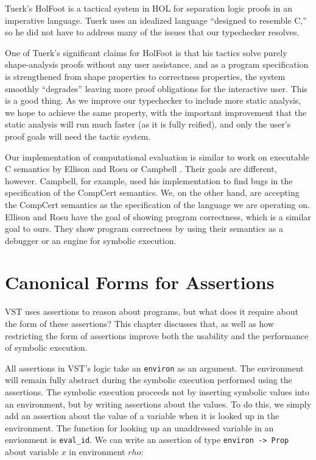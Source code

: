 \documentclass{puthesis}
\begin{document}
Tuerk's HolFoot \cite{Tuer09} is a tactical system in HOL for
separation logic proofs in an imperative language.  Tuerk uses an
idealized language ``designed to resemble C,'' so he did not have to
address many of the issues that our typechecker resolves.

One of Tuerk's significant claims for HolFoot is that his tactics
solve purely shape-analysis proofs without any user assistance, and as
a program specification is strengthened from shape properties to
correctness properties, the system smoothly ``degrades'' leaving more
proof obligations for the interactive user.  This is a good thing.  As
we improve our typechecker to include more static analysis, we hope to
achieve the same property, with the important improvement that the
static analysis will run much faster (as it is fully reified), and
only the user's proof goals will need the tactic system.

Our implementation of computational evaluation is similar to work on
executable C semantics by Ellison and Rosu \cite{ellison-rosu-2012-popl} or
Campbell \cite{Campbell-cpp-12}. Their goals are different, however.
Campbell, for example, used his implementation to find bugs in the
specification of the CompCert semantics. We, on the other hand, are accepting
the CompCert semantics as the specification of the language we are operating
on. Ellison and Rosu have the goal of showing program correctness, which is a 
similar goal to ours. They show program correctness by using their semantics as
a debugger or an engine for symbolic execution. 


\chapter{Canonical Forms for Assertions}
\label{ch:canonical}

VST uses assertions to reason about programs, but what does it require
about the form of these assertions? This chapter discusses that, as
well as how restricting the form of assertions improve both the
usability and the performance of symbolic execution.

All assertions in VST's logic take an \lstinline|environ| as an
argument. The environment will remain fully abstract
during the symbolic execution performed using the assertions. The
symbolic execution proceeds not by inserting symbolic values into an
environment, but by writing assertions about the
values. To do this, we simply add an assertion about the value of a
variable when it is looked up in the environment. The function for
looking up an unaddressed variable in an envionment is
\lstinline|eval_id|. We can write an assertion of type
\lstinline|environ -> Prop| about variable $x$ in environment $rho$:
\end{document}
